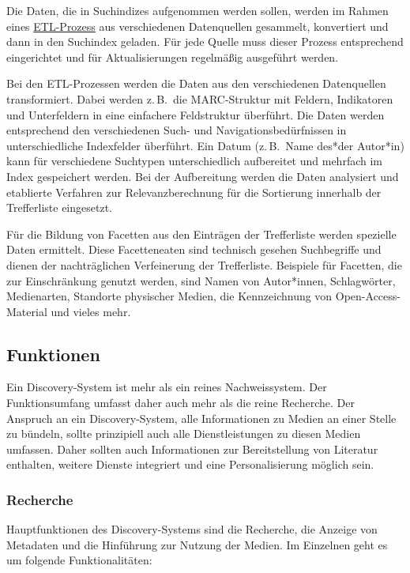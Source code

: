 \documentclass[
  11pt,
  letterpaper,
  DIV=11,
  twoside]{scrreprt}
\begin{document}
Die Daten, die in Suchindizes aufgenommen werden sollen, werden im
Rahmen eines \hyperref[etl-prozess]{ETL-Prozess} aus verschiedenen
Datenquellen gesammelt, konvertiert und dann in den Suchindex geladen.
Für jede Quelle muss dieser Prozess entsprechend eingerichtet und für
Aktualisierungen regelmäßig ausgeführt werden.

Bei den ETL-Prozessen werden die Daten aus den verschiedenen
Datenquellen transformiert. Dabei werden z.\,B.~die MARC-Struktur mit
Feldern, Indikatoren und Unterfeldern in eine einfachere Feldstruktur
überführt. Die Daten werden entsprechend den verschiedenen Such- und
Navigationsbedürfnissen in unterschiedliche Indexfelder überführt. Ein
Datum (z.\,B.~Name des*der Autor*in) kann für verschiedene Suchtypen
unterschiedlich aufbereitet und mehrfach im Index gespeichert werden.
Bei der Aufbereitung werden die Daten analysiert und etablierte
Verfahren zur Relevanzberechnung für die Sortierung innerhalb der
Trefferliste eingesetzt.

Für die Bildung von Facetten aus den Einträgen der Trefferliste werden
spezielle Daten ermittelt. Diese Facetteneaten sind technisch gesehen
Suchbegriffe und dienen der nachträglichen Verfeinerung der
Trefferliste. Beispiele für Facetten, die zur Einschränkung genutzt
werden, sind Namen von Autor*innen, Schlagwörter, Medienarten, Standorte
physischer Medien, die Kennzeichnung von Open-Access-Material und vieles
mehr.

\subsection{Funktionen}\label{funktionen}

Ein Discovery-System ist mehr als ein reines Nachweissystem. Der
Funktionsumfang umfasst daher auch mehr als die reine Recherche. Der
Anspruch an ein Discovery-System, alle Informationen zu Medien an einer
Stelle zu bündeln, sollte prinzipiell auch alle Dienstleistungen zu
diesen Medien umfassen. Daher sollten auch Informationen zur
Bereitstellung von Literatur enthalten, weitere Dienste integriert und
eine Personalisierung möglich sein.

\subsubsection{Recherche}\label{recherche}

Hauptfunktionen des Discovery-Systems sind die Recherche, die Anzeige
von Metadaten und die Hinführung zur Nutzung der Medien. Im Einzelnen
geht es um folgende Funktionalitäten:
\end{document}
